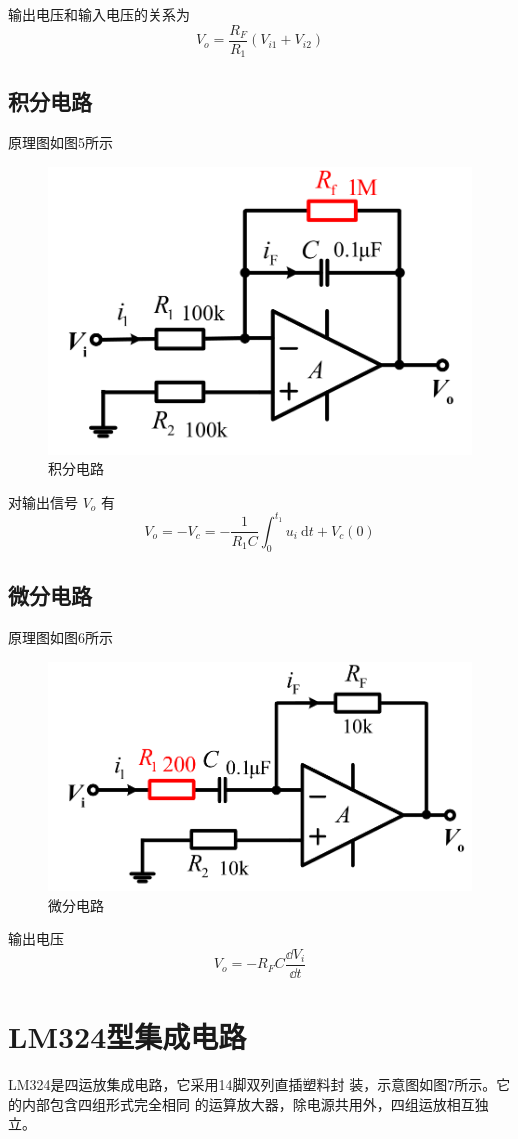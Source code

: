 \documentclass[UTF8]{article}
\begin{document}
    输出电压和输入电压的关系为
    $$
    V_o=\frac{R_F}{R_1} \left(V_{i1}+V_{i2}\right)
    $$


    \subsection{积分电路}
    原理图如图5所示

    \begin{figure}[htbp]
		\centering
        \includegraphics[width=0.5\linewidth]{sbbb5}
        \caption{积分电路}
	\end{figure}

    对输出信号 $V_{o}$ 有
    $$
    V_{o}=-V_{c}=-\frac{1}{R_{1} C} \int_{0}^{t_{1}} u_{i} \mathrm{~d} t+V_{c}(0)
    $$
    
    \subsection{微分电路}
    原理图如图6所示

    \begin{figure}[htbp]
		\centering
        \includegraphics[width=0.5\linewidth]{sbbb6}
        \caption{微分电路}
	\end{figure}

    输出电压
    $$
    V_o = - R_F C \frac{\dd V_i}{\dd t}
    $$





    \section{LM324型集成电路}
    LM324是四运放集成电路，它采用14脚双列直插塑料封
装，示意图如图7所示。它的内部包含四组形式完全相同
的运算放大器，除电源共用外，四组运放相互独立。
\end{document}
